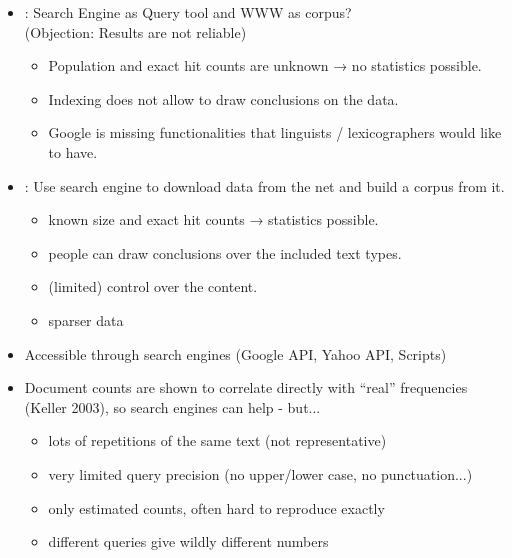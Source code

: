 \documentclass[a4paper,landscape,headrule,footrule,xetex]{foils}
\begin{document}
\begin{itemize}
\item {}: Search Engine as Query tool and WWW as corpus?
\\  (Objection: Results are not reliable)
\begin{itemize}
\item Population and exact hit counts are unknown → no statistics
possible.
\item Indexing does not allow to draw conclusions on the data.
\item[\Bad] Google is missing functionalities that linguists /
lexicographers would like to have.
\end{itemize}
\item {}: Use search engine to download data from the
net and build a corpus from it.
\begin{itemize}
\item known size and exact hit counts → statistics possible.
\item people can draw conclusions over the included text types.
\item (limited) control over the content.
\item[\Bad] sparser data
\end{itemize}
\end{itemize}

\begin{itemize}
\item Accessible through search engines (Google API, Yahoo API, Scripts)

\item Document counts are shown to correlate directly with ``real''
  frequencies (Keller 2003), so search engines can help - but...
  \begin{itemize}
  \item lots of repetitions of the same text (not representative)
  \item very limited query precision (no upper/lower case, no punctuation...)
  \item only estimated counts, often hard to reproduce exactly
  \item different queries give wildly different numbers
  \end{itemize}
\end{itemize}
\end{document}
